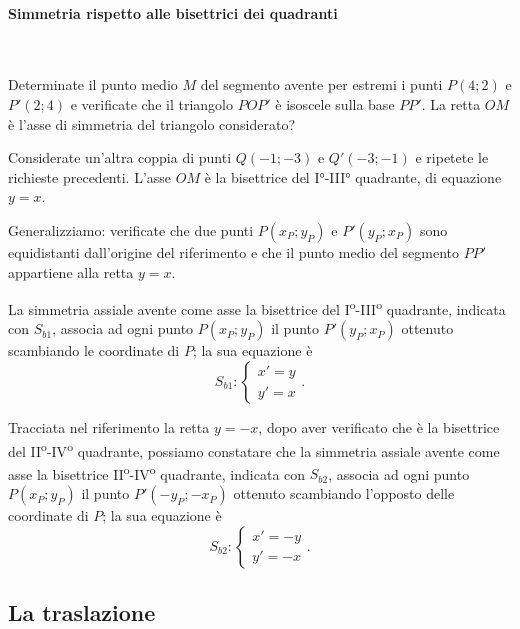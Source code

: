 \paragraph{Simmetria rispetto alle bisettrici dei quadranti}
~

\begin{exrig}
\begin{esempio}
Determinate il punto medio $M$ del segmento avente per estremi i 
punti $P(4;2)$ e $P'(2;4)$ e verificate che il triangolo $POP'$ è 
isoscele sulla base $PP'$. 
La retta $OM$ è l'asse di simmetria del triangolo considerato?

\begin{figure*}[!htb]
	
\centering
\end{figure*}

Considerate un'altra coppia di punti $Q(-1;-3)$ e $Q'(-3;-1)$ e 
ripetete le richieste precedenti.
L'asse $OM$ è la bisettrice del I°-III° quadrante, di equazione $y=x$.
\end{esempio}
\end{exrig}

Generalizziamo: verificate che due punti $P(x_P;y_P)$ e $P'(y_P;x_P)$ 
sono equidistanti dall'origine del riferimento e che il punto medio 
del segmento $PP'$ appartiene alla retta $y=x$.

La simmetria assiale avente come asse la bisettrice del 
I\textsuperscript{o}-III\textsuperscript{o} quadrante, indicata con 
$S_{b1}$, associa ad ogni punto $P(x_P;y_P)$ il punto $P'(y_P;x_P)$ 
ottenuto scambiando le coordinate di $P$; la sua equazione è
\[S_{b1}:\begin{cases}x'=y\\y'=x \end{cases}.\]

Tracciata nel riferimento la retta $y=-x$, dopo aver verificato che è 
la bisettrice del II\textsuperscript{o}-IV\textsuperscript{o} 
quadrante, possiamo constatare che la simmetria assiale avente come 
asse la bisettrice II\textsuperscript{o}-IV\textsuperscript{o} 
quadrante, indicata con $S_{b2}$, associa ad ogni punto $P(x_P;y_P)$ 
il punto $P'(-y_P;-x_P)$ ottenuto scambiando l'opposto delle 
coordinate di $P$; la sua equazione è
\[S_{b2}:\begin{cases}x'=-y\\y'=-x \end{cases}.\]


\subsection{La traslazione}

